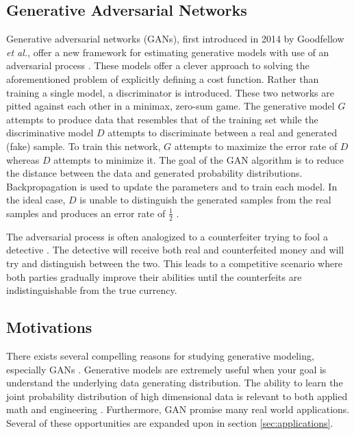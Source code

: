 \documentclass[11pt]{article}
\begin{document}
\subsection{Generative Adversarial Networks}
Generative adversarial networks (GANs), first introduced in 2014 by Goodfellow \textit{et al.}, offer a new framework for estimating generative models with use of an adversarial process \citep{2014arXiv1406.2661G}. These models offer a clever approach to solving the aforementioned problem of explicitly defining a cost function. Rather than training a single model, a discriminator is introduced. These two networks are pitted against each other in a minimax, zero-sum game. The generative model $G$ attempts to produce data that resembles that of the training set while the discriminative model $D$ attempts to discriminate between a real and generated (fake) sample. To train this network, $G$ attempts to maximize the error rate of $D$ whereas $D$ attempts to minimize it. The goal of the GAN algorithm is to reduce the distance between the data and generated probability distributions. Backpropagation is used to update the parameters and to train each model. In the ideal case, $D$ is unable to distinguish the generated samples from the real samples and produces an error rate of $\frac{1}{2}$ \citep{2014arXiv1406.2661G}.

The adversarial process is often analogized to a counterfeiter trying to fool a detective \citep{2014arXiv1406.2661G}. The detective will receive both real and counterfeited money and will try and distinguish between the two. This leads to a competitive scenario where both parties gradually improve their abilities until the counterfeits are indistinguishable from the true currency.

\subsection{Motivations}
There exists several compelling reasons for studying generative modeling, especially GANs \citep{2017arXiv170100160G}. Generative models are extremely useful when your goal is understand the underlying data generating distribution. The ability to learn the joint probability distribution of high dimensional data is relevant to both applied math and engineering \citep{2017arXiv170100160G}. Furthermore, GAN promise many real world applications. Several of these opportunities are expanded upon in section \ref{sec:applications}.
\end{document}
